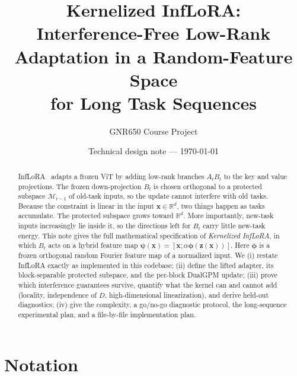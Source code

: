 \documentclass[11pt]{article}
\title{Kernelized InfLoRA:\\
Interference-Free Low-Rank Adaptation in a Random-Feature Space\\
for Long Task Sequences}
\author{GNR650 Course Project}
\date{Technical design note --- \today}
\theoremstyle{plain}
\theoremstyle{definition}
\theoremstyle{remark}
\newcommand{\R}{\mathbb{R}}
\newcommand{\M}{\mathcal{M}}
\newcommand{\x}{\bm{x}}
\newcommand{\z}{\bm{z}}
\newcommand{\vphi}{\bm{\phi}}
\newcommand{\vpsi}{\bm{\psi}}
\begin{document}
\maketitle

\begin{abstract}
InfLoRA~\cite{inflora} adapts a frozen ViT by adding low-rank branches $A_tB_t$ to the key and value projections. The frozen down-projection $B_t$ is chosen orthogonal to a protected subspace $\M_{t-1}$ of old-task inputs, so the update cannot interfere with old tasks. Because the constraint is linear in the input $\x\in\R^{d}$, two things happen as tasks accumulate. The protected subspace grows toward $\R^{d}$. More importantly, new-task inputs increasingly lie inside it, so the directions left for $B_t$ carry little new-task energy. This note gives the full mathematical specification of \emph{Kernelized InfLoRA}, in which $B_t$ acts on a hybrid feature map $\vpsi(\x)=[\x;\alpha\vphi(\z(\x))]$. Here $\vphi$ is a frozen orthogonal random Fourier feature map of a normalized input. We
(i) restate InfLoRA exactly as implemented in this codebase;
(ii) define the lifted adapter, its block-separable protected subspace, and the per-block DualGPM update;
(iii) prove which interference guarantees survive, quantify what the kernel can and cannot add (locality, independence of $D$, high-dimensional linearization), and derive held-out diagnostics;
(iv) give the complexity, a go/no-go diagnostic protocol, the long-sequence experimental plan, and a file-by-file implementation plan.
\end{abstract}

\tableofcontents
\newpage

\section{Notation}
\end{document}
